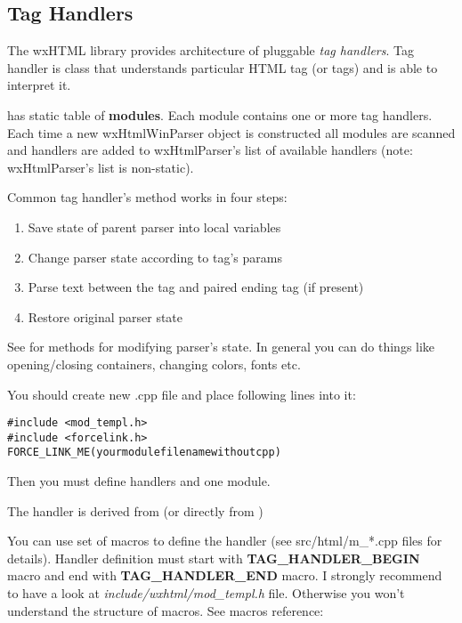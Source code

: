 \subsection{Tag Handlers}\label{handlers}

The wxHTML library provides architecture of pluggable {\it tag handlers}.
Tag handler is class that understands particular HTML tag (or tags) and is
able to interpret it.

 has static table of {\bf modules}.
Each module contains one or more tag handlers. Each time a new wxHtmlWinParser
object is constructed all modules are scanned and handlers are added
to wxHtmlParser's list of available handlers (note: wxHtmlParser's list
is non-static).


Common tag handler's  method
works in four steps:

\begin{enumerate}\itemsep=0pt
\item Save state of parent parser into local variables
\item Change parser state according to tag's params
\item Parse text between the tag and paired ending tag (if present)
\item Restore original parser state
\end{enumerate}

See  for methods for modifying
parser's state. In general you can do things like opening/closing containers,
changing colors, fonts etc.


You should create new .cpp file and place following lines into it: 

\begin{verbatim}
#include <mod_templ.h>
#include <forcelink.h>
FORCE_LINK_ME(yourmodulefilenamewithoutcpp)
\end{verbatim}

Then you must define handlers and one module.


The handler is derived from 
(or directly from )

You can use set of macros to define the handler (see src/html/m\_*.cpp files
for details). Handler definition must start with {\bf TAG\_HANDLER\_BEGIN} macro
and end with {\bf TAG\_HANDLER\_END} macro. I strongly recommend to have a look
at {\it include/wxhtml/mod\_templ.h} file. Otherwise you won't understand
the structure of macros. See macros reference:

